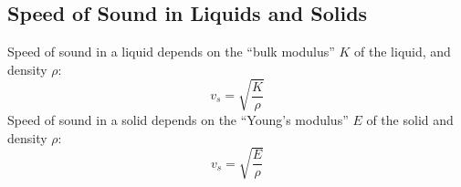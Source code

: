 \subsection{Speed of Sound in Liquids and Solids}

Speed of sound in a liquid depends on the ``bulk modulus'' $K$ of the liquid,
and density $\rho$:
\begin{equation}
  v_s = \sqrt{\frac K\rho}
\end{equation}
Speed of sound in a solid depends on the ``Young's modulus'' $E$ of the solid
and density $\rho$:
\begin{equation}
  v_s = \sqrt{\frac E\rho}
\end{equation}

%
%
%
%
%
%
%
%
%
